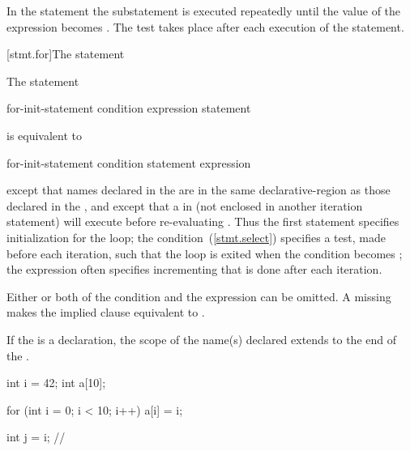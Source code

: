 \pnum
In the  statement the substatement is executed repeatedly
until the value of the expression becomes . The test takes
place after each execution of the statement.

[stmt.for]{The  statement}%

\pnum
The  statement

\begin{ncbnf}
 for-init-statement condition\opt \terminal{;} expression\opt \terminal{)} statement
\end{ncbnf}

is equivalent to

\begin{ncbnftab}
\terminal{\{}\br
\>for-init-statement\br
\> condition \terminal{) \{}\br
\>\>statement\br
\>\>expression \terminal{;}\br
\>\terminal{\}}\br
\terminal{\}}
\end{ncbnftab}

except that names declared in the  are in
the same declarative-region as those declared in the
, and except that a
%
 in  (not enclosed in another
iteration statement) will execute  before
re-evaluating .
\enternote
Thus the first statement specifies initialization for the loop; the
condition~(\ref{stmt.select}) specifies a test, made before each
iteration, such that the loop is exited when the condition becomes
; the expression often specifies incrementing that is done
after each iteration.
\exitnote

\pnum
Either or both of the condition and the expression can be omitted. A
missing  makes the implied  clause
equivalent to .

\pnum
{}%
%
If the  is a declaration, the scope of the
name(s) declared extends to the end of the .
\enterexample

\begin{codeblock}
int i = 42;
int a[10];

for (int i = 0; i < 10; i++)
  a[i] = i;

int j = i;          // 
\end{codeblock}
\exitexample

